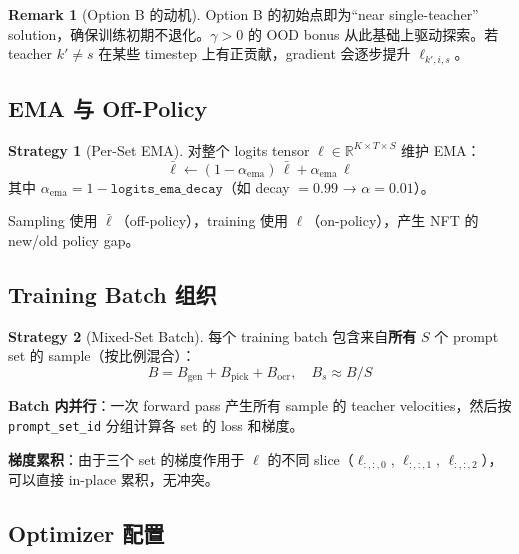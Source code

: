 \documentclass[11pt,a4paper]{article}
\newcommand{\R}{\mathbb{R}}
\theoremstyle{definition}
\newtheorem{remark}{Remark}
\newtheorem{strategy}{Strategy}
\begin{document}
\begin{remark}[Option B 的动机]
Option B 的初始点即为``near single-teacher'' solution，确保训练初期不退化。$\gamma > 0$ 的 OOD bonus 从此基础上驱动探索。若 teacher $k' \neq s$ 在某些 timestep 上有正贡献，gradient 会逐步提升 $\ell_{k',i,s}$。
\end{remark}

\subsection{EMA 与 Off-Policy}

\begin{strategy}[Per-Set EMA]
对整个 logits tensor $\ell \in \R^{K \times T \times S}$ 维护 EMA：
\begin{equation}
\bar{\ell} \leftarrow (1 - \alpha_{\mathrm{ema}})\,\bar{\ell} + \alpha_{\mathrm{ema}}\,\ell
\end{equation}
其中 $\alpha_{\mathrm{ema}} = 1 - \texttt{logits\_ema\_decay}$（如 decay $= 0.99$ → $\alpha = 0.01$）。

Sampling 使用 $\bar{\ell}$（off-policy），training 使用 $\ell$（on-policy），产生 NFT 的 new/old policy gap。
\end{strategy}

\subsection{Training Batch 组织}

\begin{strategy}[Mixed-Set Batch]
\label{strat:batch}
每个 training batch 包含来自\textbf{所有} $S$ 个 prompt set 的 sample（按比例混合）：
\begin{equation}
B = B_{\mathrm{gen}} + B_{\mathrm{pick}} + B_{\mathrm{ocr}}, \quad B_s \approx B / S
\end{equation}

\textbf{Batch 内并行}：一次 forward pass 产生所有 sample 的 teacher velocities，然后按 \texttt{prompt\_set\_id} 分组计算各 set 的 loss 和梯度。

\textbf{梯度累积}：由于三个 set 的梯度作用于 $\ell$ 的不同 slice（$\ell_{:,:,0}$, $\ell_{:,:,1}$, $\ell_{:,:,2}$），可以直接 in-place 累积，无冲突。
\end{strategy}

\subsection{Optimizer 配置}
\end{document}
